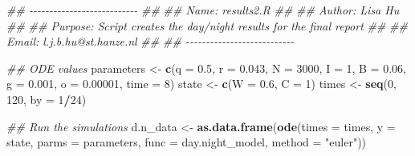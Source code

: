 \documentclass[
]{article}
\newenvironment{Shaded}{\begin{snugshade}}{\end{snugshade}}
\newcommand{\CommentTok}[1]{\textcolor[rgb]{0.56,0.35,0.01}{\textit{#1}}}
\newcommand{\DataTypeTok}[1]{\textcolor[rgb]{0.13,0.29,0.53}{#1}}
\newcommand{\DecValTok}[1]{\textcolor[rgb]{0.00,0.00,0.81}{#1}}
\newcommand{\FloatTok}[1]{\textcolor[rgb]{0.00,0.00,0.81}{#1}}
\newcommand{\KeywordTok}[1]{\textcolor[rgb]{0.13,0.29,0.53}{\textbf{#1}}}
\newcommand{\NormalTok}[1]{#1}
\newcommand{\OperatorTok}[1]{\textcolor[rgb]{0.81,0.36,0.00}{\textbf{#1}}}
\newcommand{\StringTok}[1]{\textcolor[rgb]{0.31,0.60,0.02}{#1}}
\begin{document}
\begin{Shaded}
\begin{Highlighting}[numbers=left,,]
\CommentTok{\#\# {-}{-}{-}{-}{-}{-}{-}{-}{-}{-}{-}{-}{-}{-}{-}{-}{-}{-}{-}{-}{-}{-}{-}{-}{-}{-}{-}}
\CommentTok{\#\#}
\CommentTok{\#\# Name: results2.R}
\CommentTok{\#\#}
\CommentTok{\#\# Author: Lisa Hu}
\CommentTok{\#\#}
\CommentTok{\#\# Purpose: Script creates the day/night results for the final report}
\CommentTok{\#\#}
\CommentTok{\#\# Email: l.j.b.hu@st.hanze.nl}
\CommentTok{\#\#}
\CommentTok{\#\# {-}{-}{-}{-}{-}{-}{-}{-}{-}{-}{-}{-}{-}{-}{-}{-}{-}{-}{-}{-}{-}{-}{-}{-}{-}{-}{-}}

\CommentTok{\#\# ODE values}
\NormalTok{parameters \textless{}{-}}\StringTok{ }\KeywordTok{c}\NormalTok{(}\DataTypeTok{q =} \FloatTok{0.5}\NormalTok{, }\DataTypeTok{r =} \FloatTok{0.043}\NormalTok{, }\DataTypeTok{N =} \DecValTok{3000}\NormalTok{, }\DataTypeTok{I =} \DecValTok{1}\NormalTok{,}
                \DataTypeTok{B =} \FloatTok{0.06}\NormalTok{, }\DataTypeTok{g =} \FloatTok{0.001}\NormalTok{, }\DataTypeTok{o =} \FloatTok{0.00001}\NormalTok{, }\DataTypeTok{time =} \DecValTok{8}\NormalTok{)}
\NormalTok{state \textless{}{-}}\StringTok{ }\KeywordTok{c}\NormalTok{(}\DataTypeTok{W =} \FloatTok{0.6}\NormalTok{, }\DataTypeTok{C =} \DecValTok{1}\NormalTok{)}
\NormalTok{times \textless{}{-}}\StringTok{ }\KeywordTok{seq}\NormalTok{(}\DecValTok{0}\NormalTok{, }\DecValTok{120}\NormalTok{, }\DataTypeTok{by =} \DecValTok{1}\OperatorTok{/}\DecValTok{24}\NormalTok{)}

\CommentTok{\#\# Run the simulations}
\NormalTok{d.n\_data \textless{}{-}}\StringTok{ }\KeywordTok{as.data.frame}\NormalTok{(}\KeywordTok{ode}\NormalTok{(}\DataTypeTok{times =}\NormalTok{ times, }\DataTypeTok{y =}\NormalTok{ state, }\DataTypeTok{parms =}\NormalTok{ parameters,}
                              \DataTypeTok{func =}\NormalTok{ day.night\_model, }\DataTypeTok{method =} \StringTok{"euler"}\NormalTok{))}


\end{Highlighting}
\end{Shaded}
\end{document}
